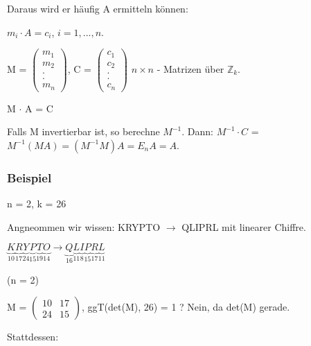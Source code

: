 Daraus wird er häufig A ermitteln können:

$m_i \cdot A = c_i$, $i=1,...,n$.

\par \medskip

M = $\begin{pmatrix}m_1 \\ m_2 \\ . \\ . \\ m_n \end{pmatrix}$, C = $\begin{pmatrix}c_1 \\ c_2 \\ . \\ . \\ c_n \end{pmatrix}$ $n \times n$ - Matrizen über $\mathbb{Z}_k$.

\par \medskip

M $\cdot$ A = C

Falls M invertierbar ist, so berechne $M^{-1}$.
\tabularnewline
Dann: $M^{-1} \cdot C$ = $M^{-1} (MA) = (M^{-1} M) A = E_n A = A$.

\subsubsection{Beispiel}

n = 2, k = 26

Angneommen wir wissen: KRYPTO $\rightarrow$ QLIPRL mit linearer Chiffre.

$\underbrace{K}_{10} \underbrace{R}_{17} \underbrace{Y}_{24} \underbrace{P}_{15} \underbrace{T}_{19} \underbrace{O}_{14} \rightarrow \underbrace{Q}_{16} \underbrace{L}_{11} \underbrace{I}_{8} \underbrace{P}_{15} \underbrace{R}_{17} \underbrace{L}_{11}$

(n = 2)

\par \medskip

M = $\begin{pmatrix}10 & 17 \\ 24 & 15\end{pmatrix}$, ggT(det(M), 26) = 1 ? Nein, da det(M) gerade.

\par \medskip

Stattdessen:

\par \medskip


